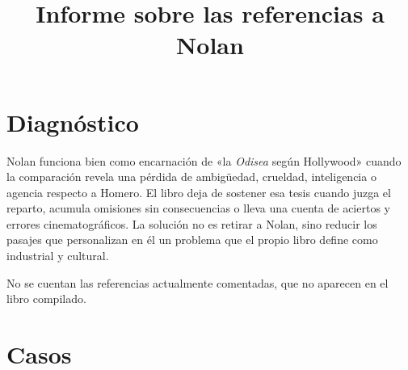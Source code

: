 \documentclass[11pt,a4paper]{article}
\title{Informe sobre las referencias a Nolan}
\author{}
\date{}
\begin{document}
\maketitle

\section*{Diagnóstico}

Nolan funciona bien como encarnación de «la \emph{Odisea} según Hollywood» cuando la comparación revela una pérdida de ambigüedad, crueldad, inteligencia o agencia respecto a Homero. El libro deja de sostener esa tesis cuando juzga el reparto, acumula omisiones sin consecuencias o lleva una cuenta de aciertos y errores cinematográficos. La solución no es retirar a Nolan, sino reducir los pasajes que personalizan en él un problema que el propio libro define como industrial y cultural.

No se cuentan las referencias actualmente comentadas, que no aparecen en el libro compilado.

\section*{Casos}
\end{document}
